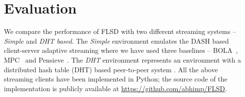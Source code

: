 \section{Evaluation}
We compare the performance of FLSD with two different streaming systems --  {\it Simple} and {\it DHT based}. The {\it Simple} environment emulates the DASH based client-server adaptive streaming where we have used three baselines -- BOLA~\cite{bola2-acm-mmsys2018}, MPC~\cite{MPC-SIGCOMM-2015} and Pensieve~\cite{Pensieve}.  The {\it DHT} environment represents an environment with a distributed hash table (DHT) based peer-to-peer system \cite{shen2013dht}.
All the above streaming clients have been implemented in Python; the source code of the implementation is publicly available at \url{https://github.com/abhimp/FLSD}.
